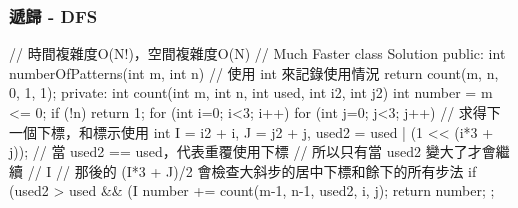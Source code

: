 \subsubsection{遞歸 - DFS}
\begin{Code}
// 時間複雜度O(N!)，空間複雜度O(N)
// Much Faster
class Solution {
public:
    int numberOfPatterns(int m, int n) {
        // 使用 int 來記錄使用情況
        return count(m, n, 0, 1, 1);
    }
private:
    int count(int m, int n, int used, int i2, int j2) {
        int number = m <= 0;
        if (!n) return 1;
        for (int i=0; i<3; i++) {
            for (int j=0; j<3; j++) {
                // 求得下一個下標，和標示使用
                int I = i2 + i, J = j2 + j, used2 = used | (1 << (i*3 + j));
                // 當 used2 == used，代表重覆使用下標
                // 所以只有當 used2 變大了才會繼續
                // I %
                // 那後的 (I*3 + J)/2 會檢查大斜步的居中下標和餘下的所有步法
                if (used2 > used && (I %
                    number += count(m-1, n-1, used2, i, j);
            }
        }
        return number;
    }
};
\end{Code}
